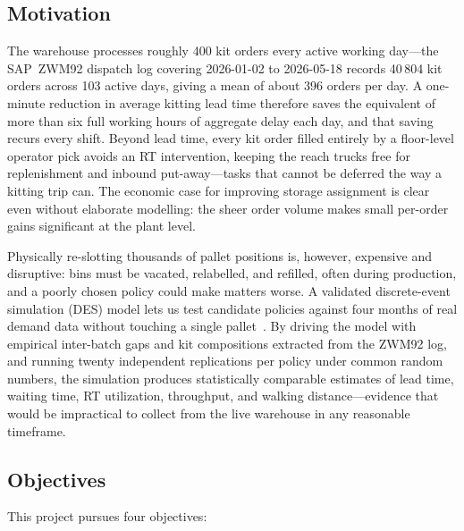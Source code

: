 \subsection{Motivation}

The warehouse processes roughly 400 kit orders every active working day---the
SAP~ZWM92 dispatch log covering 2026-01-02 to 2026-05-18 records
40\,804 kit orders across 103 active days, giving a mean of about 396
orders per day.
A one-minute reduction in average kitting lead time therefore saves the
equivalent of more than six full working hours of aggregate delay each day,
and that saving recurs every shift.
Beyond lead time, every kit order filled entirely by a floor-level operator
pick avoids an RT intervention, keeping the reach trucks free for replenishment
and inbound put-away---tasks that cannot be deferred the way a kitting trip can.
The economic case for improving storage assignment is clear even without
elaborate modelling: the sheer order volume makes small per-order gains
significant at the plant level.

Physically re-slotting thousands of pallet positions is, however, expensive
and disruptive: bins must be vacated, relabelled, and refilled, often during
production, and a poorly chosen policy could make matters worse.
A validated discrete-event simulation (DES) model lets us test candidate
policies against four months of real demand data without touching a single
pallet~\cite{negahban2014,law2015}.
By driving the model with empirical inter-batch gaps and kit compositions
extracted from the ZWM92 log, and running twenty independent replications per
policy under common random numbers, the simulation produces statistically
comparable estimates of lead time, waiting time, RT utilization, throughput,
and walking distance---evidence that would be impractical to collect from the
live warehouse in any reasonable timeframe.

\subsection{Objectives}

This project pursues four objectives:

